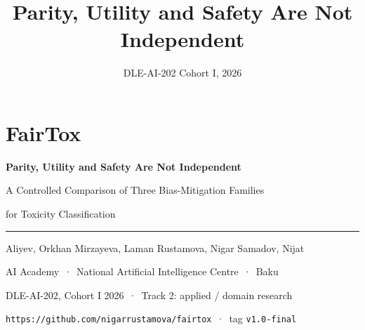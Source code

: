 \documentclass[aspectratio=169,11pt,xcolor={table}]{beamer}
\title{Parity, Utility and Safety Are Not Independent}
\date{DLE-AI-202 \quad Cohort I, 2026}
\newcommand{\repourl}{https://github.com/nigarrustamova/fairtox}
\newcommand{\repotag}{v1.0-final}
\newcommand{\hint}[1]{{\footnotesize\color{fairgrey}#1}}
\begin{document}
\section{FairTox}
\begin{frame}[plain]
  \vspace{3.5ex}
  \begin{center}
    {\Large\bfseries\color{fairblue} Parity, Utility and Safety Are Not
      Independent\par}
    \vspace{1.0ex}
    {\normalsize A Controlled Comparison of Three Bias-Mitigation Families\par}
    {\normalsize for Toxicity Classification\par}
    \vspace{1.8ex}
    {\color{fairblue!35}\rule{0.55\textwidth}{0.6pt}\par}
    \vspace{2.0ex}
    {\small Aliyev, Orkhan \qquad Mirzayeva, Laman \qquad Rustamova, Nigar
      \qquad Samadov, Nijat\par}
    \vspace{1.4ex}
    {\small AI Academy \,·\, National Artificial Intelligence Centre \,·\,
      Baku\par}
    \vspace{0.5ex}
    \hint{DLE-AI-202, Cohort I 2026 \,·\, Track 2: applied / domain research}
    \vspace{2.4ex}

    \hint{\texttt{\repourl} \,·\, tag \texttt{\repotag}}
  \end{center}
\end{frame}
\end{document}
